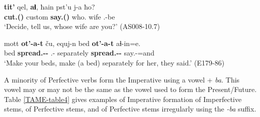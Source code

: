 \begin{exe}
	\ex\label{verbflex-ex06}
	\begin{xlist}
		
		\ex\label{verbflex-ex06a}
		\gll \textbf{tit'} qel, \textbf{aɬ}, ħain pst'u j-a ħo? \\
		\textbf{cut.{\Pfv}({\Imp})} custom \textbf{say.{\Pfv}({\Imp})} who.{\Gen} wife {\F}.{\Sg}-be {\Ssg} \\
		\trans `Decide, tell us, whose wife are you?'
		\hfill (AS008-10.7)
		
		\ex\label{verbflex-ex06b}
		\gll mott \textbf{ot'-a-t} ču, equj-n bed \textbf{ot'-a-t} aɬ-in=e. \\
		bed \textbf{spread.{\Pfv}-{\Imp}-{\Pl}} {\Pv} {\Prox}.{\Obl}-{\Dat} separately \textbf{spread.{\Pfv}-{\Imp}-{\Pl}} say.{\Pfv}-{\Aor}=and \\
		\trans `Make your beds, make (a bed) separately for her, they said.'
		\hfill (E179-86)
		
	\end{xlist}
\end{exe}

A minority of Perfective verbs form the Imperative using a vowel + \textit{ba}. This vowel may or may not be the same as the vowel used to form the Present/Future. Table \ref{TAME-table4} gives examples of Imperative formation of Imperfective stems, of Perfective stems, and of Perfective stems irregularly using the \textit{-ba} suffix.

